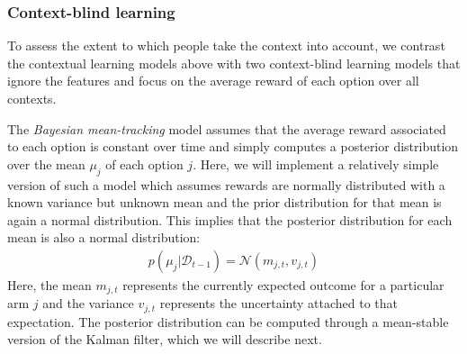 \documentclass[a4paper,natbib]{apa6}
\begin{document}
\subsubsection{Context-blind learning}

To assess the extent to which people take the context into account, we contrast the contextual learning models above with two context-blind learning models that ignore the features and focus on the average reward of each option over all contexts. 

The \emph{Bayesian mean-tracking} model assumes that the average reward associated to each option is constant over time and simply computes a posterior distribution over the mean $\mu_j$ of each option $j$. Here, we will implement a relatively simple version of such a model which assumes rewards are normally distributed with a known variance but unknown mean and the prior distribution for that mean is again a normal distribution. This implies that the posterior distribution for each mean is also a normal distribution: 
\begin{align}
p(\mu_j|\mathcal{D}_{t-1}) = \mathcal{N}(m_{j,t},v_{j,t})
\end{align}
Here, the mean $m_{j,t}$ represents the currently expected outcome for a particular arm $j$ and the variance $v_{j,t}$ represents the uncertainty attached to that expectation. The posterior distribution can be computed through a mean-stable version of the Kalman filter, which we will describe next.
\end{document}
